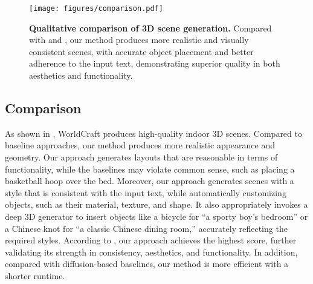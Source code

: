 \begin{table}[t]
\centering
\caption{\textbf{Quantitative comparison on 3D scene generation.} Our approach achieves the best performance in terms of consistency, aesthetics, and functionality.}
\label{tab:comparison}
\end{table}



\begin{figure*}[t]
\begin{center}
    \texttt{[image: figures/comparison.pdf]}
\end{center}
\caption{\textbf{Qualitative comparison of 3D scene generation. } Compared with \cite{yang2024holodeck} and \cite{li2025dreamscene}, our method produces more realistic and visually consistent scenes, with accurate object placement and better adherence to the input text, demonstrating superior quality in both aesthetics and functionality.
}
\label{fig:comparison}
\end{figure*}


\subsection{Comparison}
As shown in , WorldCraft produces high-quality indoor 3D scenes. Compared to baseline approaches, our method produces more realistic appearance and geometry. Our approach generates layouts that are reasonable in terms of functionality, while the baselines may violate common sense, such as placing a basketball hoop over the bed. Moreover, our approach generates scenes with a style that is consistent with the input text, while automatically customizing objects, such as their material, texture, and shape. It also appropriately invokes a deep 3D generator to insert objects like a bicycle for ``a sporty boy's bedroom'' or a Chinese knot for ``a classic Chinese dining room,'' accurately reflecting the required styles. According to , our approach achieves the highest score, further validating its strength in consistency, aesthetics, and functionality. In addition, compared with diffusion-based baselines, our method is more efficient with a shorter runtime.




